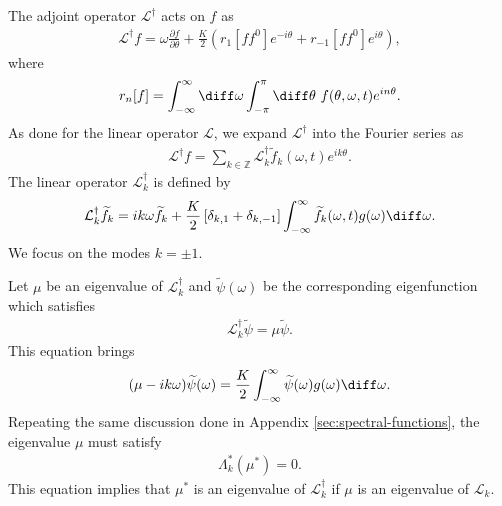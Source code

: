 The adjoint operator $\mathcal{L}^{\dagger}$ acts on $f$ as
\begin{align}
  \mathcal{L}^{\dagger}f
  = \omega\frac{\partial f}{\partial\theta}
  + \frac{K}{2}\left(r_{1}[ff^{0}]e^{-i\theta}+r_{-1}[ff^{0}]e^{i\theta}\right),
\end{align}
where
\begin{align}
  r_{n}[f] = \int_{-\infty}^{\infty} \diff\omega \int_{-\pi}^{\pi} \diff\theta~
  f(\theta,\omega,t) e^{in\theta}.
\end{align}
As done for the linear operator $\mathcal{L}$,
we expand $\mathcal{L}^{\dagger}$ into the Fourier series as
\begin{align}
  \mathcal{L}^{\dagger}f
  = \sum_{k\in\mathbb{Z}}
  \mathcal{L}^{\dagger}_{k}\widetilde{f}_{k}(\omega,t) e^{ik\theta}.
\end{align}
The linear operator $\mathcal{L}^{\dagger}_{k}$ is defined by
\begin{align}
  \mathcal{L}^{\dagger}_{k} \widetilde{f}_{k}
  = ik\omega \widetilde{f}_{k}
  + \frac{K}{2} \left[ \delta_{k,1} + \delta_{k,-1} \right]
  \int_{-\infty}^{\infty} \widetilde{f}_{k}(\omega,t) g(\omega) \diff\omega.
\end{align}
We focus on the modes $k=\pm 1$.

Let $\mu$ be an eigenvalue of $\mathcal{L}_{k}^{\dagger}$
and $\widetilde{\psi}(\omega)$ be the corresponding eigenfunction
which satisfies
\begin{align}
  \mathcal{L}_{k}^{\dagger}\widetilde{\psi} = \mu \widetilde{\psi}.
\end{align}
This equation brings
\begin{align}
  (\mu-ik\omega) \widetilde{\psi}(\omega)
  = \frac{K}{2} \int_{-\infty}^{\infty}
  \widetilde{\psi}(\omega) g(\omega) \diff\omega.
  \label{eq:tildepsi-equation}
\end{align}
Repeating the same discussion done in Appendix \ref{sec:spectral-functions},
the eigenvalue $\mu$ must satisfy
\begin{align}
  \Lambda_{k}^{\ast}(\mu^{\ast}) = 0.
\end{align}
This equation implies that $\mu^{\ast}$ is an eigenvalue
of $\mathcal{L}^{\dagger}_{k}$ if $\mu$ is an eigenvalue of $\mathcal{L}_{k}$.

